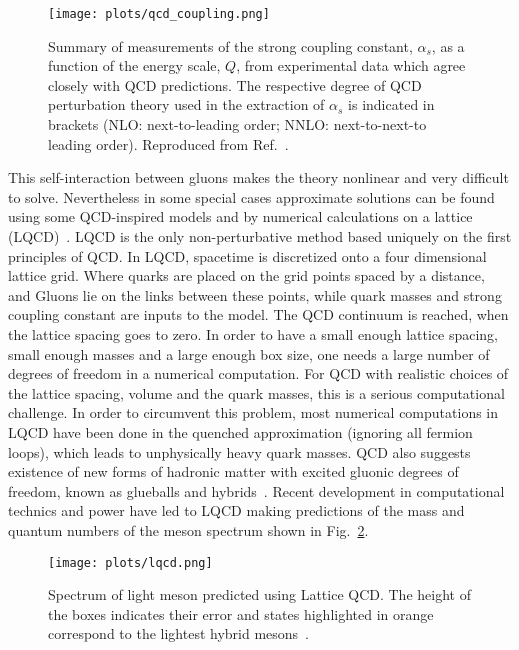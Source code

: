 \begin{figure}[H]
    \centering
        \texttt{[image: plots/qcd\_coupling.png]}
        \caption{Summary of measurements of the strong coupling constant, $\alpha_{s}$, as a function of the energy scale, $Q$, from experimental data which agree closely with QCD predictions. The respective degree of QCD perturbation theory used in the extraction of $\alpha_{s}$ is indicated in brackets (NLO: next-to-leading order; NNLO: next-to-next-to leading order). Reproduced from Ref.~\cite{8}.}
        \label{fig.1.1.2}
\end{figure}

This self-interaction between gluons makes the theory nonlinear and very difficult to solve. Nevertheless in some special cases approximate solutions can be found using some QCD-inspired models and by numerical calculations on a lattice (LQCD)~\cite{12}. LQCD is the only non-perturbative method based uniquely on the first principles of QCD. In LQCD, spacetime is discretized onto a four dimensional lattice grid. Where quarks are placed on the grid points spaced by a distance, and Gluons lie on the links between these points, while quark masses and strong coupling constant are inputs to the model. The QCD continuum is reached, when the lattice spacing goes to zero. In order to have a small enough lattice spacing, small enough masses and a large enough box size, one needs a large number of degrees of freedom in a numerical computation. For QCD with realistic choices of the lattice spacing, volume and the quark masses, this is a serious computational challenge. In order to circumvent this problem, most numerical computations in LQCD have been done in the quenched approximation (ignoring all fermion loops), which leads to unphysically heavy quark masses. QCD also suggests existence of new forms of hadronic matter with excited gluonic degrees of freedom, known as glueballs and hybrids~\cite{8}. Recent development in computational technics and power have led to LQCD making predictions of the mass and quantum numbers of the meson spectrum shown in Fig.~\ref{fig.1.1.3}.

\begin{figure}[H]
    \centering
        \texttt{[image: plots/lqcd.png]}
        \caption{Spectrum of light meson predicted using Lattice QCD. The height of the boxes indicates their error and states highlighted in orange correspond to the lightest hybrid mesons~\cite{12}.}
        \label{fig.1.1.3}
\end{figure}

